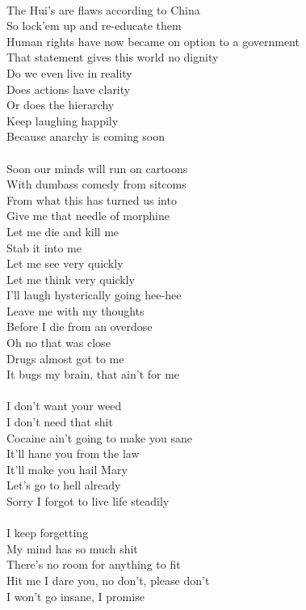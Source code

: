 \documentclass[12pt, b5paper, oneside]{book}
\begin{document}
\\The Hui's are flaws according to China
\\So lock'em up and re-educate them
\\Human rights have now became on option to a government
\\That statement gives this world no dignity
\\Do we even live in reality
\\Does actions have clarity
\\Or does the hierarchy
\\Keep laughing happily
\\Because anarchy is coming soon
%
\\\\Soon our minds will run on cartoons
\\With dumbass comedy from sitcoms
\\From what this has turned us into
\\Give me that needle of morphine
\\Let me die and kill me
\\Stab it into me
\\Let me see very quickly
\\Let me think very quickly
\\I'll laugh hysterically going hee-hee
\\Leave me with my thoughts
\\Before I die from an overdose
\\Oh no that was close
\\Drugs almost got to me
\\It bugs my brain, that ain't for me
%
\\\\I don't want your weed
\\I don't need that shit
\\Cocaine ain't going to make you sane
\\It'll hane you from the law
\\It'll make you hail Mary
\\Let's go to hell already
\\Sorry I forgot to live life steadily
%
\\\\I keep forgetting
\\My mind has so much shit
\\There's no room for anything to fit
\\Hit me I dare you, no don't, please don't
\\I won't go insane, I promise
\end{document}
